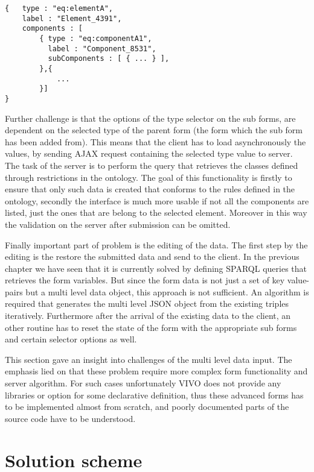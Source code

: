 \begin{lstlisting}[basicstyle=\footnotesize, frame=single, caption={Multi level form data in JSON}, label=multiData, captionpos=b, belowskip=1em, aboveskip=2em]
{	type : "eq:elementA",
	label : "Element_4391",
	components : [
		{ type : "eq:componentA1",
		  label : "Component_8531",	
		  subComponents : [ { ... } ],
		},{ 
			... 
		}]
}
\end{lstlisting}


Further challenge is that the options of the type selector on the sub forms, are dependent on the selected type of the parent form (the form which the sub form has been added from). This means that the client has to load asynchronously the values, by sending AJAX request containing the selected type value to server. The task of the server is to perform the query that retrieves the classes defined through restrictions in the ontology. The goal of this functionality is firstly to ensure that only such data is created that conforms to the rules defined in the ontology, secondly the interface is much more usable if not all the components are listed, just the ones that are belong to the selected element. Moreover in this way the validation on the server after submission can be omitted.

Finally important part of problem is the editing of the data. The first step by the editing is the restore the submitted data and send to the client. In the previous chapter we have seen that it is currently solved by defining  SPARQL queries that retrieves the form variables. But since the form data is not just a set of key value-pairs but a multi level data object, this approach is not sufficient. An algorithm is required that generates the multi level JSON object from the existing triples iteratively. Furthermore after the arrival of the existing data to the client, an other routine has to reset the state of the form with the appropriate sub forms and certain selector options as well.


This section gave an insight into challenges of the multi level data input. The emphasis lied on that these problem require more complex form functionality and server algorithm. For such cases unfortunately VIVO does not provide any libraries or option for some declarative definition, thus these advanced forms has to be implemented almost from scratch, and poorly documented parts of the source code have to be understood.

\section{Solution scheme}

